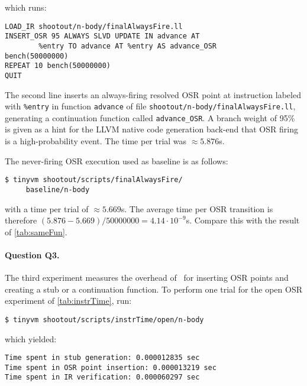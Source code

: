 \noindent which runs:

\begin{small}
\begin{verbatim}
LOAD_IR shootout/n-body/finalAlwaysFire.ll
INSERT_OSR 95 ALWAYS SLVD UPDATE IN advance AT 
        %entry TO advance AT %entry AS advance_OSR
bench(50000000)
REPEAT 10 bench(50000000)
QUIT
\end{verbatim}
\end{small}

\noindent The second line inserts an always-firing resolved OSR point at instruction labeled with {\tt \%entry} in function {\tt advance} of file {\tt shootout/n-body/finalAlwaysFire.ll}, generating a continuation function called {\tt advance\_OSR}. A branch weight of 95\% is given as a hint for the LLVM native code generation back-end that OSR firing is a high-probability event. The time per trial was $\approx5.876$s.

The never-firing OSR execution used as baseline is as follows:
\begin{small}
\begin{verbatim}
$ tinyvm shootout/scripts/finalAlwaysFire/
     baseline/n-body
\end{verbatim}
\end{small}

\noindent with a time per trial of $\approx5.669$s. The average time per OSR transition is therefore $(5.876-5.669)/50000000=4.14\cdot 10^{-9}$s. Compare this with the result of \ref{tab:sameFun}.

\paragraph{Question Q3.} The third experiment measures the overhead of \osrkit\ for inserting OSR points and creating a stub or a continuation function. To perform one trial for the open OSR experiment of \ref{tab:instrTime}, run:
\begin{small}
\begin{verbatim}
$ tinyvm shootout/scripts/instrTime/open/n-body
\end{verbatim}
\end{small}
\noindent which yielded:
\begin{small}
\begin{verbatim}
Time spent in stub generation: 0.000012835 sec
Time spent in OSR point insertion: 0.000013219 sec
Time spent in IR verification: 0.000060297 sec
\end{verbatim}
\end{small}

